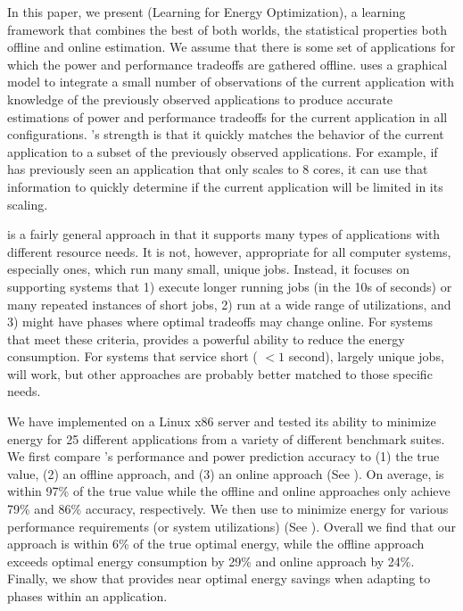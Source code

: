 In this paper, we present \SYSTEM{} (Learning for Energy
Optimization), a learning framework that combines the best of both
worlds, \ie the statistical properties both offline and online
estimation.  We assume that there is some set of applications for
which the power and performance tradeoffs are gathered offline.
\SYSTEM{} uses a graphical model to integrate a small number of
observations of the current application with knowledge of the
previously observed applications to produce accurate estimations of
power and performance tradeoffs for the current application in all
configurations.  \SYSTEM{}'s strength is that it quickly matches the
behavior of the current application to a subset of the previously
observed applications.  For example, if \SYSTEM{} has previously seen
an application that only scales to 8 cores, it can use that
information to quickly determine if the current application will be
limited in its scaling.


\SYSTEM{} is a fairly general approach in that it supports many types
of applications with different resource needs.  It is not, however,
appropriate for all computer systems, especially ones, which run many
small, unique jobs.  Instead, it focuses on supporting systems that 1)
execute longer running jobs (in the 10s of seconds) or many repeated
instances of short jobs, 2) run at a wide range of utilizations, and
3) might have phases where optimal tradeoffs may change online.  For
systems that meet these criteria, \SYSTEM{} provides a powerful
ability to reduce the energy consumption.  For systems that service
short ( $< 1$ second), largely unique jobs, \SYSTEM{} will work, but
other approaches are probably better matched to those specific needs.

We have implemented \SYSTEM{} on a Linux x86 server and tested its
ability to minimize energy for 25 different applications from a
variety of different benchmark suites.  We first compare \SYSTEM{}'s
performance and power prediction accuracy to (1) the true value, (2)
an offline approach, and (3) an online approach (See
).  On average, \SYSTEM{} is within 97\% of the true
value while the offline and online approaches only achieve 79\% and
86\% accuracy, respectively.  We then use \SYSTEM{} to minimize energy
for various performance requirements (or system utilizations) (See
).  Overall we find that our approach is
within 6\% of the true optimal energy, while the offline approach
exceeds optimal energy consumption by 29\% and online approach by
24\%.  Finally, we show that \SYSTEM{} provides near optimal energy
savings when adapting to phases within an application.

